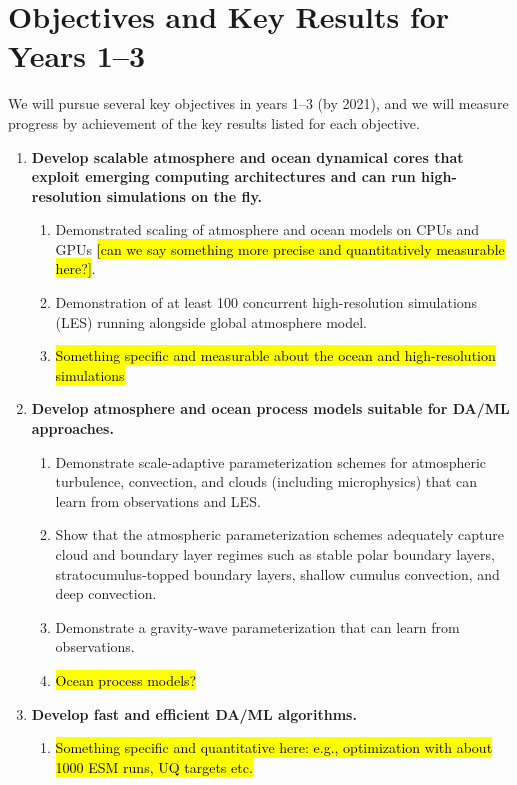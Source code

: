 \documentclass{article}
\begin{document}
\section{Objectives and Key Results for Years 1--3}

We will pursue several key objectives in years 1--3 (by 2021), and we will measure progress by achievement of the key results listed for each objective.
\begin{enumerate}
    \item \textbf{Develop scalable atmosphere and ocean dynamical cores that exploit emerging computing architectures and can run high-resolution simulations on the fly.}
    \begin{enumerate}
        \item Demonstrated scaling of atmosphere and ocean models on CPUs and GPUs \hl{[can we say something more precise and quantitatively measurable here?]}.
        \item Demonstration of at least 100 concurrent high-resolution simulations (LES) running alongside global atmosphere model.
        \item \hl{Something specific and measurable about the ocean and high-resolution simulations}
    \end{enumerate}
    
    \item \textbf{Develop atmosphere and ocean process models suitable for DA/ML approaches.}
    \begin{enumerate}
        \item Demonstrate scale-adaptive parameterization schemes for atmospheric turbulence, convection, and clouds (including microphysics) that can learn from observations and LES.
        \item Show that the atmospheric parameterization schemes adequately capture cloud and boundary layer regimes such as stable polar boundary layers, stratocumulus-topped boundary layers, shallow cumulus convection, and deep convection.
        \item Demonstrate a gravity-wave parameterization that can learn from observations.
        \item \hl{Ocean process models?}
        
    \end{enumerate}
    
    \item \textbf{Develop fast and efficient DA/ML algorithms.}
     \begin{enumerate}
        \item \hl{Something specific and quantitative here: e.g., optimization with about 1000 ESM runs, UQ targets etc.}
    \end{enumerate}
    

\end{enumerate}
\end{document}
